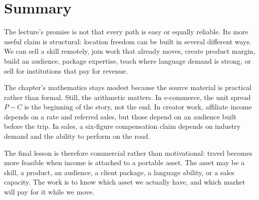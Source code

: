 \section{Summary}

The lecture's promise is not that every path is easy or equally reliable. Its more useful claim is structural: location freedom can be built in several different ways. We can sell a skill remotely, join work that already moves, create product margin, build an audience, package expertise, teach where language demand is strong, or sell for institutions that pay for revenue.

The chapter's mathematics stays modest because the source material is practical rather than formal. Still, the arithmetic matters. In e-commerce, the unit spread \(P-C\) is the beginning of the story, not the end. In creator work, affiliate income depends on a rate and referred sales, but those depend on an audience built before the trip. In sales, a six-figure compensation claim depends on industry demand and the ability to perform on the road.

The final lesson is therefore commercial rather than motivational: travel becomes more feasible when income is attached to a portable asset. The asset may be a skill, a product, an audience, a client package, a language ability, or a sales capacity. The work is to know which asset we actually have, and which market will pay for it while we move.